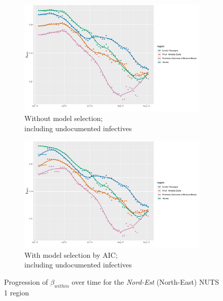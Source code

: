 \documentclass[12pt]{article}
\begin{document}
    \begin{figure}[H]\ContinuedFloat
	    \begin{subfigure}{\textwidth}
	      \centering
	      \includegraphics[width=0.95\linewidth]{output/model_within_lag14_betawithin_Nord-Est_UndocQuadratic_rolling.pdf}
	      \caption{Without model selection; \\ including undocumented infectives}
	      \label{fig:beta_within_over_time_nordest_regular_undoc}
	    \end{subfigure}\newline
	    \begin{subfigure}{\textwidth}
	      \centering
	      \includegraphics[width=0.95\linewidth]{output/model_within_lag14_betawithin_Nord-Est_aic_UndocQuadratic_rolling.pdf}
	      \caption{With model selection by AIC; \\ including undocumented infectives}
	      \label{fig:beta_within_over_time_nordest_aic_undoc}
	    \end{subfigure}
	    \caption{Progression of $\beta_{within}$ over time for the \textit{Nord-Est} (North-East) NUTS 1 region}
	    \label{fig:beta_within_over_time_nordest}
    \end{figure}
	
\end{document}

